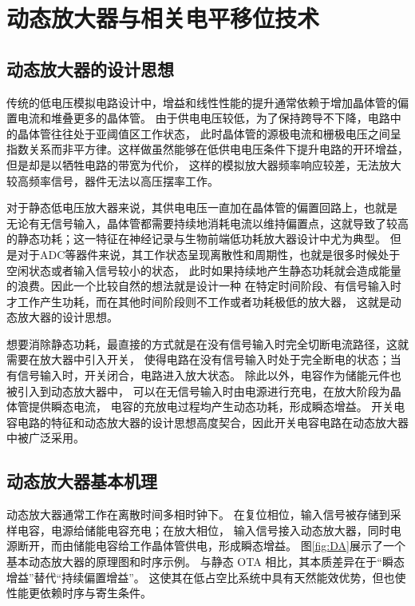 

\section{动态放大器与相关电平移位技术}
\subsection{动态放大器的设计思想}
传统的低电压模拟电路设计中，增益和线性性能的提升通常依赖于增加晶体管的偏置电流和堆叠更多的晶体管。
由于供电电压较低，为了保持跨导不下降，电路中的晶体管往往处于亚阈值区工作状态，
此时晶体管的源极电流和栅极电压之间呈指数关系而非平方律。这样做虽然能够在低供电电压条件下提升电路的开环增益，
但是却是以牺牲电路的带宽为代价，
这样的模拟放大器频率响应较差，无法放大较高频率信号，器件无法以高压摆率工作\cite{tai2006bulkdrivenopamp,rajagopal2023subthresholdopamp}。
\par
对于静态低电压放大器来说，其供电电压一直加在晶体管的偏置回路上，也就是
无论有无信号输入，晶体管都需要持续地消耗电流以维持偏置点，这就导致了较高的静态功耗；这一特征在神经记录与生物前端低功耗放大器设计中尤为典型\cite{harrison2003neuralamp,chaya2020ultralowota,mukherjee2022ultralowia}。
但是对于ADC等器件来说，其工作状态呈现离散性和周期性，也就是很多时候处于空闲状态或者输入信号较小的状态，
此时如果持续地产生静态功耗就会造成能量的浪费。因此一个比较自然的想法就是设计一种
在特定时间阶段、有信号输入时才工作产生功耗，而在其他时间阶段则不工作或者功耗极低的放大器，
这就是动态放大器的设计思想。
\par
想要消除静态功耗，最直接的方式就是在没有信号输入时完全切断电流路径，这就需要在放大器中引入开关，
使得电路在没有信号输入时处于完全断电的状态；当有信号输入时，开关闭合，电路进入放大状态。
除此以外，电容作为储能元件也被引入到动态放大器中，
可以在无信号输入时由电源进行充电，在放大阶段为晶体管提供瞬态电流，
电容的充放电过程均产生动态功耗，形成瞬态增益。
开关电容电路的特征和动态放大器的设计思想高度契合，因此开关电容电路在动态放大器中被广泛采用。
\subsection{动态放大器基本机理}
动态放大器通常工作在离散时间多相时钟下。
在复位相位，输入信号被存储到采样电容，电源给储能电容充电；在放大相位，
输入信号接入动态放大器，同时电源断开，而由储能电容给工作晶体管供电，形成瞬态增益。
图\ref{fig:DA}展示了一个基本动态放大器的原理图和时序示例。
与静态 OTA 相比，其本质差异在于“瞬态增益”替代“持续偏置增益”。
这使其在低占空比系统中具有天然能效优势，但也使性能更依赖时序与寄生条件。

